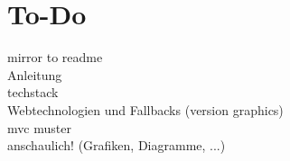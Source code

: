 \documentclass[a4paper]{article}
\begin{document}
\section{To-Do}
mirror to readme\\
Anleitung\\
techstack\\
Webtechnologien und Fallbacks (version graphics)\\
mvc muster\\
anschaulich! (Grafiken, Diagramme, ...)
\end{document}
